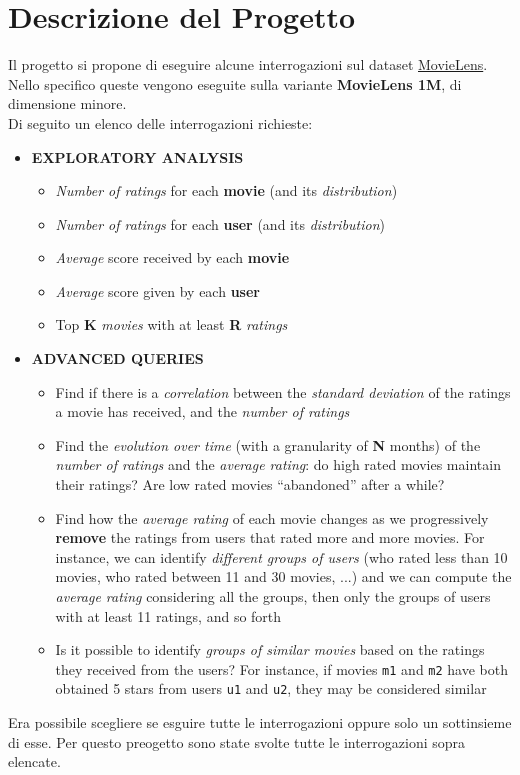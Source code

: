 \documentclass{article}
\begin{document}
    \section{Descrizione del Progetto}
        Il progetto si propone di eseguire alcune interrogazioni sul dataset \href{https://grouplens.org/datasets/movielens/}{MovieLens}. Nello specifico queste vengono eseguite sulla variante \textbf{MovieLens 1M}, di dimensione minore.\\
        Di seguito un elenco delle interrogazioni richieste:
        \begin{itemize}
            \item \textbf{EXPLORATORY ANALYSIS}
                  \begin{itemize}
                    \item \textit{Number of ratings} for each \textbf{movie} (and its \textit{distribution})
                    \item \textit{Number of ratings} for each \textbf{user} (and its \textit{distribution})
                    \item \textit{Average} score received by each \textbf{movie}
                    \item \textit{Average} score given by each \textbf{user}
                    \item Top \textbf{K} \textit{movies} with at least \textbf{R} \textit{ratings}
                  \end{itemize}
            \item \textbf{ADVANCED QUERIES}
                  \begin{itemize}
                    \item Find if there is a \textit{correlation} between the \textit{standard deviation} of the ratings a movie has received, and the \textit{number of ratings}
                    \item Find the \textit{evolution over time} (with a granularity of \textbf{N} months) of the \textit{number of ratings} and the \textit{average rating}: do high rated movies maintain their ratings? Are low rated movies “abandoned” after a while?
                    \item Find how the \textit{average rating} of each movie changes as we progressively \textbf{remove} the ratings from users that rated more and more movies. For instance, we can identify \textit{different groups of users} (who rated less than 10 movies, who rated between 11 and 30 movies, ...) and we can compute the \textit{average rating} considering all the groups, then only the groups of users with at least 11 ratings, and so forth
                    \item Is it possible to identify \textit{groups of similar movies} based on the ratings they received from the users? For instance, if movies \texttt{m1} and \texttt{m2} have both obtained 5 stars from users \texttt{u1} and \texttt{u2}, they may be considered similar
                  \end{itemize}
        \end{itemize}
        Era possibile scegliere se esguire tutte le interrogazioni oppure solo un sottinsieme di esse. Per questo preogetto sono state svolte tutte le interrogazioni sopra elencate.
\end{document}
